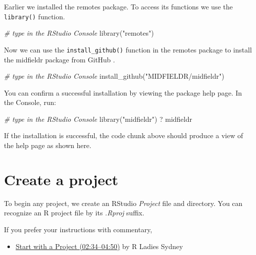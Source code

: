 \documentclass[
]{book}
\newenvironment{Shaded}{\begin{snugshade}}{\end{snugshade}}
\newcommand{\CommentTok}[1]{\textcolor[rgb]{0.56,0.35,0.01}{\textit{#1}}}
\newcommand{\FunctionTok}[1]{\textcolor[rgb]{0.00,0.00,0.00}{#1}}
\newcommand{\NormalTok}[1]{#1}
\newcommand{\StringTok}[1]{\textcolor[rgb]{0.31,0.60,0.02}{#1}}
\providecommand{\tightlist}{%
  \setlength{\itemsep}{0pt}\setlength{\parskip}{0pt}}
\begin{document}
Earlier we installed the remotes package. To access its functions we use the \texttt{library()} function.

\begin{Shaded}
\begin{Highlighting}[]
\CommentTok{\# type in the RStudio Console  }
\FunctionTok{library}\NormalTok{(}\StringTok{"remotes"}\NormalTok{)}
\end{Highlighting}
\end{Shaded}

Now we can use the \texttt{install\_github()} function in the remotes package to install the midfieldr package from GitHub \citep{R-midfieldr}.

\begin{Shaded}
\begin{Highlighting}[]
\CommentTok{\# type in the RStudio Console  }
\FunctionTok{install\_github}\NormalTok{(}\StringTok{"MIDFIELDR/midfieldr"}\NormalTok{)}
\end{Highlighting}
\end{Shaded}

You can confirm a successful installation by viewing the package help page. In the Console, run:

\begin{Shaded}
\begin{Highlighting}[]
\CommentTok{\# type in the RStudio Console }
\FunctionTok{library}\NormalTok{(}\StringTok{"midfieldr"}\NormalTok{)}
\NormalTok{? midfieldr}
\end{Highlighting}
\end{Shaded}

If the installation is successful, the code chunk above should produce a view of the help page as shown here.

\hypertarget{create-a-project}{%
\section*{Create a project}\label{create-a-project}}

To begin any project, we create an RStudio \emph{Project} file and directory. You can recognize an R project file by its \emph{.Rproj} suffix.

If you prefer your instructions with commentary,

\begin{itemize}
\tightlist
\item
  \href{https://www.youtube.com/embed/kfcX5DEMAp4?start=154\&end=290}{Start with a Project (02:34--04:50)} by R Ladies Sydney \citep{RLadiesSydney:2018:Lesson1}
\end{itemize}
\end{document}
